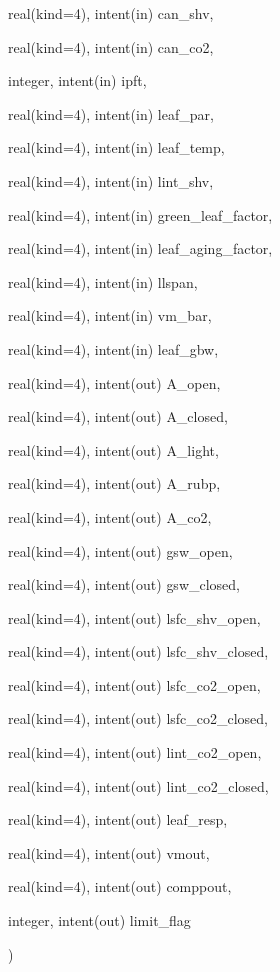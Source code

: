 {\begin{DoxyParamCaption}
\item[{real(kind=4), intent(in)}]{can\+\_\+shv, }
\item[{real(kind=4), intent(in)}]{can\+\_\+co2, }
\item[{integer, intent(in)}]{ipft, }
\item[{real(kind=4), intent(in)}]{leaf\+\_\+par, }
\item[{real(kind=4), intent(in)}]{leaf\+\_\+temp, }
\item[{real(kind=4), intent(in)}]{lint\+\_\+shv, }
\item[{real(kind=4), intent(in)}]{green\+\_\+leaf\+\_\+factor, }
\item[{real(kind=4), intent(in)}]{leaf\+\_\+aging\+\_\+factor, }
\item[{real(kind=4), intent(in)}]{llspan, }
\item[{real(kind=4), intent(in)}]{vm\+\_\+bar, }
\item[{real(kind=4), intent(in)}]{leaf\+\_\+gbw, }
\item[{real(kind=4), intent(out)}]{A\+\_\+open, }
\item[{real(kind=4), intent(out)}]{A\+\_\+closed, }
\item[{real(kind=4), intent(out)}]{A\+\_\+light, }
\item[{real(kind=4), intent(out)}]{A\+\_\+rubp, }
\item[{real(kind=4), intent(out)}]{A\+\_\+co2, }
\item[{real(kind=4), intent(out)}]{gsw\+\_\+open, }
\item[{real(kind=4), intent(out)}]{gsw\+\_\+closed, }
\item[{real(kind=4), intent(out)}]{lsfc\+\_\+shv\+\_\+open, }
\item[{real(kind=4), intent(out)}]{lsfc\+\_\+shv\+\_\+closed, }
\item[{real(kind=4), intent(out)}]{lsfc\+\_\+co2\+\_\+open, }
\item[{real(kind=4), intent(out)}]{lsfc\+\_\+co2\+\_\+closed, }
\item[{real(kind=4), intent(out)}]{lint\+\_\+co2\+\_\+open, }
\item[{real(kind=4), intent(out)}]{lint\+\_\+co2\+\_\+closed, }
\item[{real(kind=4), intent(out)}]{leaf\+\_\+resp, }
\item[{real(kind=4), intent(out)}]{vmout, }
\item[{real(kind=4), intent(out)}]{comppout, }
\item[{integer, intent(out)}]{limit\+\_\+flag}
\end{DoxyParamCaption}
)}\hypertarget{namespacefarq__leuning_a93499fd595f405b9df3bf88c5be1569e}{}\label{namespacefarq__leuning_a93499fd595f405b9df3bf88c5be1569e}


